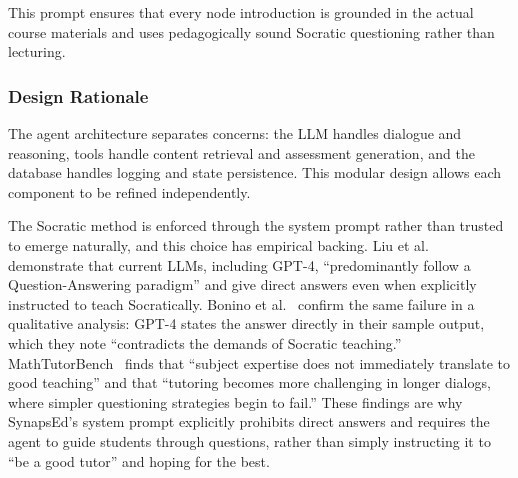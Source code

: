 \documentclass{stylefiles/capstone}
\begin{document}




This prompt ensures that every node introduction is grounded in the actual course materials and uses pedagogically sound Socratic questioning rather than lecturing.

\subsubsection{Design Rationale}

The agent architecture separates concerns: the LLM handles dialogue and reasoning, tools handle content retrieval and assessment generation, and the database handles logging and state persistence. This modular design allows each component to be refined independently.

The Socratic method is enforced through the system prompt rather than trusted to emerge naturally, and this choice has empirical backing. Liu et al.~\cite{liu2024socraticlm} demonstrate that current LLMs, including GPT-4, ``predominantly follow a Question-Answering paradigm'' and give direct answers even when explicitly instructed to teach Socratically. Bonino et al.~\cite{bonino2024euler} confirm the same failure in a qualitative analysis: GPT-4 states the answer directly in their sample output, which they note ``contradicts the demands of Socratic teaching.'' MathTutorBench~\cite{macina2025mathtutorbench} finds that ``subject expertise does not immediately translate to good teaching'' and that ``tutoring becomes more challenging in longer dialogs, where simpler questioning strategies begin to fail.'' These findings are why SynapsEd's system prompt explicitly prohibits direct answers and requires the agent to guide students through questions, rather than simply instructing it to ``be a good tutor'' and hoping for the best.
\end{document}
